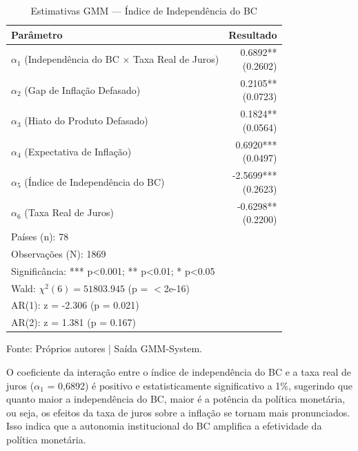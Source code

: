 \documentclass[a4paper,12pt]{article}
\begin{document}
\begin{table}[H]
    \centering
    \caption{Estimativas GMM — Índice de Independência do BC}
    \label{tab:gmm_estimates}
    \begin{tabular}{lr} 
        \toprule
        \textbf{Parâmetro} & \textbf{Resultado} \\
        \midrule
        $\alpha_1$ (Independência do BC $\times$ Taxa Real de Juros) & \makecell[r]{0.6892** \\ (0.2602)} \\
        $\alpha_2$ (Gap de Inflação Defasado) & \makecell[r]{0.2105** \\ (0.0723)} \\
        $\alpha_3$ (Hiato do Produto Defasado) & \makecell[r]{0.1824** \\ (0.0564)} \\
        $\alpha_4$ (Expectativa de Inflação) & \makecell[r]{0.6920*** \\ (0.0497)} \\
        $\alpha_5$ (Índice de Independência do BC) & \makecell[r]{-2.5699*** \\ (0.2623)} \\
        $\alpha_6$ (Taxa Real de Juros) & \makecell[r]{-0.6298** \\ (0.2200)} \\
        \midrule
        \multicolumn{2}{l}{Países (n): 78} \\
        \multicolumn{2}{l}{Observações (N): 1869} \\
        \multicolumn{2}{l}{Significância: *** p<0.001; ** p<0.01; * p<0.05} \\
        \multicolumn{2}{l}{Wald: $\chi^2(6) = 51803.945$ (p = $<$2e-16)} \\
        \multicolumn{2}{l}{AR(1): z = -2.306 (p = 0.021)} \\
        \multicolumn{2}{l}{AR(2): z = 1.381 (p = 0.167)} \\
        \bottomrule
    \end{tabular}
    
    \footnotesize{Fonte: Próprios autores | Saída GMM-System}.
\end{table}

O coeficiente da interação entre o índice de independência do BC e a taxa real de juros ($\alpha_1$ = 0,6892) é positivo e estatisticamente significativo a 1\%, sugerindo que quanto maior a independência do BC, maior é a potência da política monetária, ou seja, os efeitos da taxa de juros sobre a inflação se tornam mais pronunciados. Isso indica que a autonomia institucional do BC amplifica a efetividade da política monetária.
\end{document}
